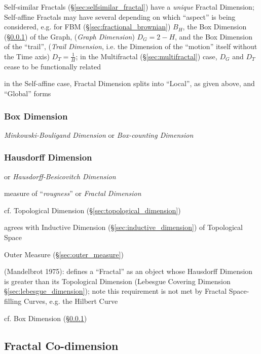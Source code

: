 Self-similar Fractals (\S\ref{sec:selfsimilar_fractal}) have a \emph{unique}
Fractal Dimension; Self-affine Fractals may have several depending on which
``aspect'' is being considered, e.g. for FBM (\S\ref{sec:fractional_brownian})
$B_H$, the Box Dimension (\S\ref{sec:box_dimension}) of the Graph,
(\emph{Graph Dimension}) $D_G = 2 - H$, and the Box Dimension of the ``trail'',
(\emph{Trail Dimension}, i.e. the Dimension of the ``motion'' itself without the
Time axis) $D_T = \frac{1}{H}$; in the Multifractal (\S\ref{sec:multifractal})
case, $D_G$ and $D_T$ cease to be functionally related

in the Self-affine case, Fractal Dimension splits into ``Local'', as given
above, and ``Global'' forms



\subsubsection{Box Dimension}\label{sec:box_dimension}

\emph{Minkowski-Bouligand Dimension} or \emph{Box-counting Dimension}



\subsubsection{Hausdorff Dimension}\label{sec:hausdorff_dimension}

or \emph{Hausdorff-Besicovitch Dimension}

measure of ``\emph{rougness}'' or \emph{Fractal Dimension}

cf. Topological Dimension (\S\ref{sec:topological_dimension})

agrees with Inductive Dimension (\S\ref{sec:inductive_dimension}) of Topological
Space

Outer Measure (\S\ref{sec:outer_measure})

(Mandelbrot 1975): defines a ``Fractal'' as an object whose Hausdorff Dimension
is greater than its Topological Dimension (Lebesgue Covering Dimension
\S\ref{sec:lebesgue_dimension}); note this requirement is not met by Fractal
Space-filling Curves, e.g. the Hilbert Curve

cf. Box Dimension (\S\ref{sec:box_dimension})



\subsection{Fractal Co-dimension}\label{sec:fractal_codimension}

